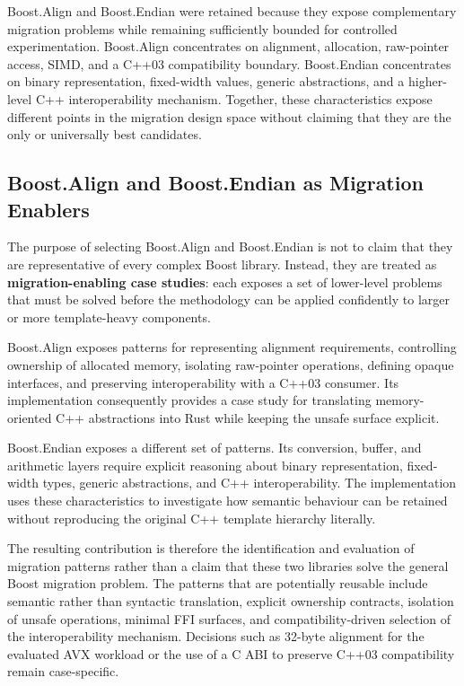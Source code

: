         Boost.Align and Boost.Endian were retained because they expose complementary migration
        problems while remaining sufficiently bounded for controlled experimentation. Boost.Align
        concentrates on alignment, allocation, raw-pointer access, SIMD, and a C++03 compatibility
        boundary. Boost.Endian concentrates on binary representation, fixed-width values, generic
        abstractions, and a higher-level C++ interoperability mechanism. Together, these
        characteristics expose different points in the migration design space without claiming
        that they are the only or universally best candidates.

        \subsection{Boost.Align and Boost.Endian as Migration Enablers}
        \label{sec:migration_enablers}

        The purpose of selecting Boost.Align and Boost.Endian is not to claim that they are representative of every complex Boost library. Instead, they are treated as \textbf{migration-enabling case studies}: each exposes a set of lower-level problems that must be solved before the methodology can be applied confidently to larger or more template-heavy components.

        Boost.Align exposes patterns for representing alignment requirements, controlling ownership of allocated memory, isolating raw-pointer operations, defining opaque interfaces, and preserving interoperability with a C++03 consumer. Its implementation consequently provides a case study for translating memory-oriented C++ abstractions into Rust while keeping the unsafe surface explicit.

        Boost.Endian exposes a different set of patterns. Its conversion, buffer, and arithmetic layers require explicit reasoning about binary representation, fixed-width types, generic abstractions, and C++ interoperability. The implementation uses these characteristics to investigate how semantic behaviour can be retained without reproducing the original C++ template hierarchy literally.

        The resulting contribution is therefore the identification and evaluation of migration patterns rather than a claim that these two libraries solve the general Boost migration problem. The patterns that are potentially reusable include semantic rather than syntactic translation, explicit ownership contracts, isolation of unsafe operations, minimal FFI surfaces, and compatibility-driven selection of the interoperability mechanism. Decisions such as 32-byte alignment for the evaluated AVX workload or the use of a C ABI to preserve C++03 compatibility remain case-specific.

